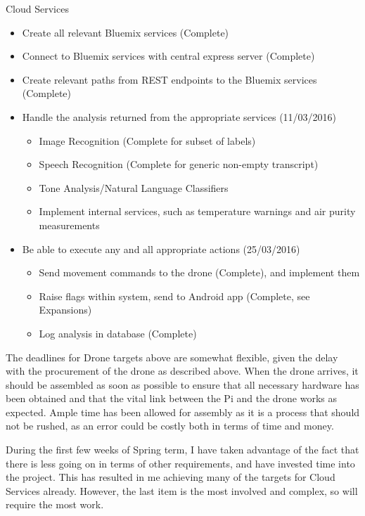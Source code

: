 \documentclass{article}
\begin{document}
\vspace{\baselineskip} \noindent
Cloud Services
\begin{itemize}
    \item Create all relevant Bluemix services (Complete)
    \item Connect to Bluemix services with central express server (Complete)
    \item Create relevant paths from REST endpoints to the Bluemix services (Complete)
    \item Handle the analysis returned from the appropriate services (11/03/2016)
        \begin{itemize}
            \item Image Recognition (Complete for subset of labels)
            \item Speech Recognition (Complete for generic non-empty transcript)
            \item Tone Analysis/Natural Language Classifiers
            \item Implement internal services, such as temperature warnings and air purity measurements
        \end{itemize}
    \item Be able to execute any and all appropriate actions (25/03/2016)
        \begin{itemize}
            \item Send movement commands to the drone (Complete), and implement them
            \item Raise flags within system, send to Android app (Complete, see Expansions)
            \item Log analysis in database (Complete)
        \end{itemize}
\end{itemize}

\vspace{\baselineskip} \noindent
The deadlines for Drone targets above are somewhat flexible, given the delay with the procurement of the drone as described above. When the drone arrives, it should be assembled as soon as possible to ensure that all necessary hardware has been obtained and that the vital link between the Pi and the drone works as expected. Ample time has been allowed for assembly as it is a process that should not be rushed, as an error could be costly both in terms of time and money.

\vspace{\baselineskip} \noindent
During the first few weeks of Spring term, I have taken advantage of the fact that there is less going on in terms of other requirements, and have invested time into the project. This has resulted in me achieving many of the targets for Cloud Services already. However, the last item is the most involved and complex, so will require the most work.
\end{document}

